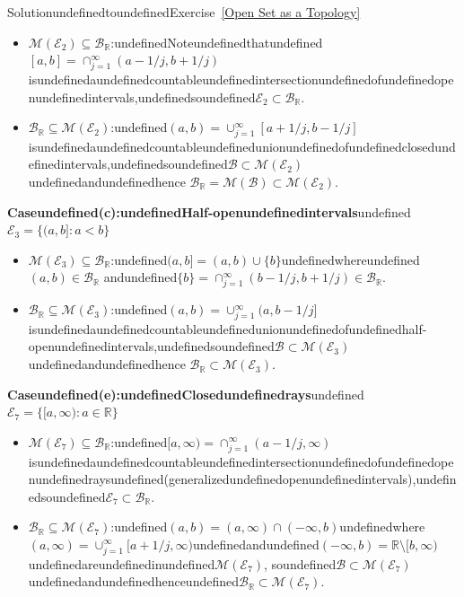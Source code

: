 \begin{mystsolution}{SolutionundefinedtoundefinedExercise~\ref{Open Set as a Topology}}
\begin{itemize}
\item $\mathcal{M}(\mathcal{E}_2) \subseteq \mathcal{B}_\mathbb{R}$:undefinedNoteundefinedthatundefined$[a,b] = \cap_{j=1}^{\infty}(a -1/j, b+1/j)$
isundefinedaundefinedcountableundefinedintersectionundefinedofundefinedopenundefinedintervals,undefinedsoundefined$\mathcal{E}_2 \subset \mathcal{B}_\mathbb{R}$.
\item $\mathcal{B}_\mathbb{R} \subseteq \mathcal{M}(\mathcal{E}_2)$:undefined$(a,b) = \cup_{j=1}^{\infty}[a+1/j, b -1/j]$
isundefinedaundefinedcountableundefinedunionundefinedofundefinedclosedundefinedintervals,undefinedsoundefined$\mathcal{B} \subset \mathcal{M}(\mathcal{E}_2)$undefinedandundefinedhence
$\mathcal{B}_\mathbb{R} = \mathcal{M}(\mathcal{B}) \subset \mathcal{M}(\mathcal{E}_2)$.
\end{itemize}

\textbf{Caseundefined(c):undefinedHalf-openundefinedintervals}undefined$\mathcal{E}_3 = \{(a,b]: a < b\}$

\begin{itemize}
\item $\mathcal{M}(\mathcal{E}_3) \subseteq \mathcal{B}_\mathbb{R}$:undefined$(a,b] = (a,b) \cup \{b\}$undefinedwhereundefined$(a,b) \in \mathcal{B}_\mathbb{R}$
andundefined$\{b\} = \cap_{j=1}^{\infty}(b -1/j, b+1/j) \in \mathcal{B}_\mathbb{R}$.
\item $\mathcal{B}_\mathbb{R} \subseteq \mathcal{M}(\mathcal{E}_3)$:undefined$(a,b) = \cup_{j=1}^{\infty}(a, b -1/j]$
isundefinedaundefinedcountableundefinedunionundefinedofundefinedhalf-openundefinedintervals,undefinedsoundefined$\mathcal{B} \subset \mathcal{M}(\mathcal{E}_3)$undefinedandundefinedhence
$\mathcal{B}_\mathbb{R} \subset \mathcal{M}(\mathcal{E}_3)$.
\end{itemize}

\textbf{Caseundefined(e):undefinedClosedundefinedrays}undefined$\mathcal{E}_7 = \{[a,\infty): a \in \mathbb{R}\}$

\begin{itemize}
\item $\mathcal{M}(\mathcal{E}_7) \subseteq \mathcal{B}_\mathbb{R}$:undefined$[a,\infty) = \cap_{j=1}^{\infty}(a -1/j, \infty)$
isundefinedaundefinedcountableundefinedintersectionundefinedofundefinedopenundefinedraysundefined(generalizedundefinedopenundefinedintervals),undefinedsoundefined$\mathcal{E}_7 \subset \mathcal{B}_\mathbb{R}$.
\item $\mathcal{B}_\mathbb{R} \subseteq \mathcal{M}(\mathcal{E}_7)$:undefined$(a,b) = (a,\infty) \cap ( -\infty,b)$undefinedwhere
$(a,\infty) = \cup_{j=1}^{\infty}[a+1/j,\infty)$undefinedandundefined$( -\infty,b) = \mathbb{R} \setminus [b,\infty)$undefinedareundefinedinundefined$\mathcal{M}(\mathcal{E}_7)$,
soundefined$\mathcal{B} \subset \mathcal{M}(\mathcal{E}_7)$undefinedandundefinedhenceundefined$\mathcal{B}_\mathbb{R} \subset \mathcal{M}(\mathcal{E}_7)$.
\end{itemize}


\end{mystsolution}
